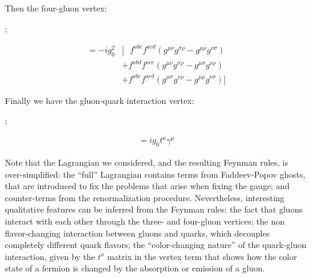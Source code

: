 Then the four-gluon vertex:
\begin{center}
    \begin{minipage}{0.4\textwidth}
        \hspace{2cm};
    \end{minipage}
    \begin{minipage}{0.58\textwidth}
        \begin{align}\nonumber = -ig_0^2&
        [~~~f^{abe}f^{acd}(g^{\mu\nu}g^{\sigma\rho} - g^{\mu\rho}g^{\nu\sigma}) \\\nonumber
        &+f^{abd}f^{ace}(g^{\mu\nu}g^{\sigma\rho} - g^{\mu\sigma}g^{\nu\rho}) \\\nonumber 
        &+f^{abc}f^{aed}(g^{\mu\sigma}g^{\nu\rho} - g^{\mu\rho}g^{\nu\sigma})]
        \end{align}
    \end{minipage}
\end{center}
Finally we have the gluon-quark interaction vertex:
\begin{center}
    \begin{minipage}{0.4\textwidth}
        \hspace{2cm};
    \end{minipage}
    \begin{minipage}{0.58\textwidth}
        \hspace{-1.5cm}\begin{align}\nonumber = ig_0t^a\gamma^\mu
        \end{align}
    \end{minipage}
\end{center}
Note that the Lagrangian we considered, and the resulting Feynman rules, is over-simplified: the ``full'' Lagrangian contains terms from Faddeev-Popov ghosts, that are introduced to fix the problems that arise when fixing the gauge; and counter-terms from the renormalization procedure. Nevertheless, interesting qualitative features can be inferred from the Feynman rules: the fact that gluons interact with each other through the three- and four-gluon vertices; the non flavor-changing interaction between gluons and quarks, which decouples completely different quark flavors; the ``color-changing nature'' of the quark-gluon interaction, given by the $t^a$ matrix in the vertex term that shows how the color state of a fermion is changed by the absorption or emission of a gluon.\\
 

